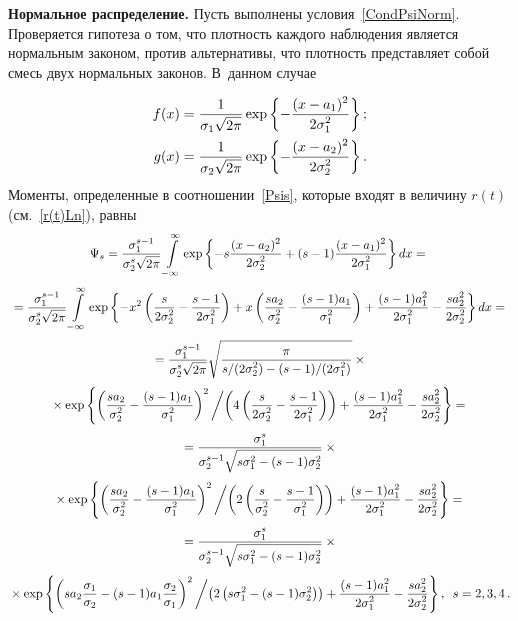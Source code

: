 \textbf{Нормальное распределение.} Пусть выполнены
условия~\eqref{CondPsiNorm}. Проверяется гипотеза о том, что
плотность каждого наблюдения является нормальным законом, против
альтернативы, что плотность представляет собой смесь двух нормальных
законов. В~данном случае

\noindent
\begin{align*}
f(x)&=\fr{1}{\sigma_1\sqrt{2\pi}}\exp{\left\{-\fr{(x-a_1)^2}{2\sigma_1^2}\right\}}\,;\\
g(x)&=\fr{1}{\sigma_2\sqrt{2\pi}}\exp{\left\{-\fr{(x-a_2)^2}{2\sigma_2^2}\right\}}\,.
\end{align*}
Моменты, определенные в соотношении~\eqref{Psis}, которые входят в
величину $r(t)$ (см.~\eqref{r(t)Ln}), равны
\begin{multline*}
\Psi_s=\fr{\sigma^{s-1}_1}{\sigma_2^s\sqrt{2\pi}}\int\limits_{-\infty}^\infty
\exp{\left\{-s\fr{(x-a_2)^2}{2\sigma_2^2}+(s-1)\fr{(x-a_1)^2}{2\sigma_1^2}\right\}}\,dx={}\\[3pt]
{}=\fr{\sigma^{s-1}_1}{\sigma_2^s\sqrt{2\pi}}\int\limits_{-\infty}^\infty
\exp{\left\{-x^2\left(\fr{s}{2\sigma_2^2}-\fr{s-1}{2\sigma_1^2}\right)+x\left(
\fr{sa_2}{\sigma_2^2}-\fr{(s-1)a_1}{\sigma_1^2}
\right)+\fr{(s-1)a_1^2}{2\sigma_1^2}-\fr{s a_2^2}{2\sigma_2^2}\right\}}\,dx={}\\[3pt]
{}=\fr{\sigma^{s-1}_1}{\sigma_2^s\sqrt{2\pi}}
\sqrt{\fr\pi{{s}/({2\sigma_2^2})-(s-1)/(2\sigma_1^2)}}\times{}\\[3pt]
{}\times\exp{\left\{\left(\fr{s a_2}{\sigma_2^2}-
\fr{(s-1)a_1}{\sigma_1^2}
\right)^2\biggl{/}\left(4\left(\fr{s}{2\sigma_2^2}-\fr{s-1}{2\sigma_1^2}\right)\right)
+\fr{(s-1)a_1^2}{2\sigma_1^2}-\fr{s a_2^2}{2\sigma_2^2}\right\}}={}\\[3pt]
{}=\fr{\sigma_1^s}{\sigma_2^{s-1}\sqrt{s\sigma_1^2-(s-1)\sigma_2^2}}\times{}\\[3pt]
{}\times\exp{\left\{\left(\fr{s a_2}{\sigma_2^2}-\fr{(s-1)a_1}{\sigma_1^2}
\right)^2\biggl{/}\left(2\left(\fr{s}{\sigma_2^2}-\fr{s-1}{\sigma_1^2}\right)\right)
+\fr{(s-1)a_1^2}{2\sigma_1^2}-\fr{s a_2^2}{2\sigma_2^2}\right\}}={}\\[3pt]
{}=\fr{\sigma_1^s}{\sigma_2^{s-1}\sqrt{s\sigma_1^2-(s-1)\sigma_2^2}}\times{}\\[3pt]
{}\times\exp{\left\{\left(s a_2 \fr{\sigma_1}{\sigma_2}-(s-1)a_1
\fr{\sigma_2}{\sigma_1}\right)^2
\biggl{/}\left(2\left(s\sigma_1^2-(s-1)\sigma_2^2\right)\right)
+\fr{(s-1)a_1^2}{2\sigma_1^2}-\fr{s a_2^2}{2\sigma_2^2}\right\}}\,,\enskip
s=2,3,4\,.
\end{multline*}

